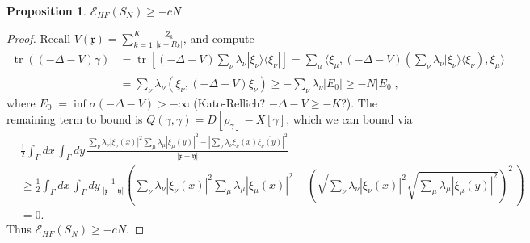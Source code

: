 \documentclass[11pt]{amsart}
\newcommand{\R}{\mathbb{R}}
\newtheorem{prop}{Proposition}
\theoremstyle{definition}
\theoremstyle{definition}
\theoremstyle{definition}
\numberwithin{equation}{section}
\begin{document}







\begin{prop}
$\mathcal{E}_{HF}(S_N)\ge -cN$.
\end{prop}
\begin{proof}
Recall $V(\mathfrak{x})=\sum_{k=1}^K\frac{Z_k}{|\mathfrak{x}-R_k|}$, and compute
\begin{align*}
\operatorname{tr}((-\Delta-V)\gamma)&=\operatorname{tr}[(-\Delta-V)\sum_\nu\lambda_\nu|\xi_\nu\rangle\langle\xi_\nu|]=\sum_{\mu}\langle \xi_\mu,(-\Delta-V)(\sum_\nu\lambda_\nu|\xi_\nu\rangle\langle\xi_\nu),\xi_\mu\rangle\\
&=\sum_\nu\lambda_\nu(\xi_\nu,(-\Delta-V)\xi_\nu)\ge-\sum_\nu \lambda_\nu|E_0|\ge -N|E_0|,
\end{align*}
where $E_0:=\inf\sigma(-\Delta-V)>-\infty$ (Kato-Rellich? $-\Delta-V\ge-K$?).
The remaining term to bound is $Q(\gamma,\gamma)=D[\rho_\gamma]-X[\gamma]$, which we can bound via
\begin{align*}
&\frac{1}{2}\int_\Gamma dx\,\int_\Gamma dy\,\frac{\sum_\nu\lambda_\nu|\xi_\nu(x)|^2\sum_{\mu}\lambda_\mu|\xi_\mu(y)|^2-\left|\sum_\nu\lambda_\nu\xi_\nu(x)\overline{\xi_\nu(y)}\right|^2}{|\mathfrak{x}-\mathfrak{y}|}\\
&\ge\frac{1}{2}\int_\Gamma dx\,\int_\Gamma dy\,\frac{1}{|\mathfrak{x}-\mathfrak{y}|}\left(\sum_\nu\lambda_\nu|\xi_\nu(x)|^2\sum_\mu\lambda_\mu|\xi_\mu(x)|^2-\left(\sqrt{\sum_\nu\lambda_\nu|\xi_\nu(x)|^2}\sqrt{\sum_\mu\lambda_\mu|\xi_\mu(y)|^2}\right)^2\,\right)\\
&=0.
\end{align*}
Thus $\mathcal{E}_{HF}(S_N)\ge-cN$.
\end{proof}
\end{document}
